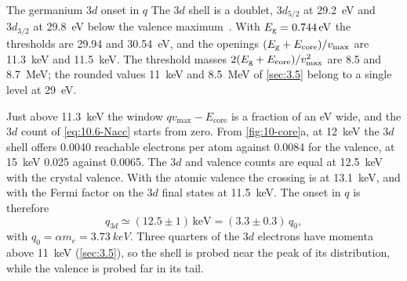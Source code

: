 \begin{workedexample}{The germanium $3d$ onset in $q$}\label{we:10-ge3d}
The $3d$ shell is a doublet, $3d_{5/2}$ at \SI{29.2}{eV} and $3d_{3/2}$ at \SI{29.8}{eV} below the valence maximum~\cite[Table~1-1]{williams2009electron}. With $E_{\mathrm{g}} = \SI{0.744}{eV}$ the thresholds are 29.94 and \SI{30.54}{eV}, and the openings $(E_{\mathrm{g}} + E_{\mathrm{core}})/v_{\mathrm{max}}$ are \SI{11.3}{keV} and \SI{11.5}{keV}. The threshold masses $2(E_{\mathrm{g}} + E_{\mathrm{core}})/v_{\mathrm{max}}^2$ are 8.5 and \SI{8.7}{MeV}; the rounded values \SI{11}{keV} and \SI{8.5}{MeV} of \cref{sec:3.5} belong to a single level at \SI{29}{eV}.

Just above \SI{11.3}{keV} the window $qv_{\mathrm{max}} - E_{\mathrm{core}}$ is a fraction of an eV wide, and the $3d$ count of \cref{eq:10.6-Nacc} starts from zero. From \cref{fig:10-core}a, at \SI{12}{keV} the $3d$ shell offers 0.0040 reachable electrons per atom against 0.0084 for the valence, at \SI{15}{keV} 0.025 against 0.0065. The $3d$ and valence counts are equal at \SI{12.5}{keV} with the crystal valence. With the atomic valence the crossing is at \SI{13.1}{keV}, and with the Fermi factor on the $3d$ final states at \SI{11.5}{keV}. The onset in $q$ is therefore
\begin{equation*}
  q_{3d} \simeq (12.5 \pm 1)\,\mathrm{keV} = (3.3 \pm 0.3)\,q_0 ,
\end{equation*}
with $q_0 = \alpha m_e = \SI{3.73}{keV}$. Three quarters of the $3d$ electrons have momenta above \SI{11}{keV} (\cref{sec:3.5}), so the shell is probed near the peak of its distribution, while the valence is probed far in its tail.


\end{workedexample}
